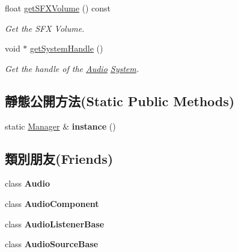\begin{DoxyCompactItemize}
float \hyperlink{class_magnum_1_1_audio_1_1_manager_a97df6d7c2738ba77d35581978a076379}{get\+S\+F\+X\+Volume} () const 
\begin{DoxyCompactList}\small\item\em Get the S\+FX Volume. \end{DoxyCompactList}\item 
void $\ast$ \hyperlink{class_magnum_1_1_audio_1_1_manager_a666d38790d8532041580f8908be4c3ed}{get\+System\+Handle} ()
\begin{DoxyCompactList}\small\item\em Get the handle of the \hyperlink{class_magnum_1_1_audio}{Audio} \hyperlink{class_magnum_1_1_system}{System}. \end{DoxyCompactList}\end{DoxyCompactItemize}
\subsection*{靜態公開方法(Static Public Methods)}
\begin{DoxyCompactItemize}
\item 
static \hyperlink{class_magnum_1_1_audio_1_1_manager}{Manager} \& {\bfseries instance} ()\hypertarget{class_magnum_1_1_audio_1_1_manager_a9f266534db2ea5671e2a008b228bf3c3}{}\label{class_magnum_1_1_audio_1_1_manager_a9f266534db2ea5671e2a008b228bf3c3}

\end{DoxyCompactItemize}
\subsection*{類別朋友(Friends)}
\begin{DoxyCompactItemize}
\item 
class {\bfseries Audio}\hypertarget{class_magnum_1_1_audio_1_1_manager_a211f008bd6a46efe478fe81d31e28933}{}\label{class_magnum_1_1_audio_1_1_manager_a211f008bd6a46efe478fe81d31e28933}

\item 
class {\bfseries Audio\+Component}\hypertarget{class_magnum_1_1_audio_1_1_manager_af76924648e1e664d148d0e3951b5a9ce}{}\label{class_magnum_1_1_audio_1_1_manager_af76924648e1e664d148d0e3951b5a9ce}

\item 
class {\bfseries Audio\+Listener\+Base}\hypertarget{class_magnum_1_1_audio_1_1_manager_a76a29692301e521e926995991a14b87d}{}\label{class_magnum_1_1_audio_1_1_manager_a76a29692301e521e926995991a14b87d}

\item 
class {\bfseries Audio\+Source\+Base}\hypertarget{class_magnum_1_1_audio_1_1_manager_a93f447a7ad19640b0dd05bafe9ba5552}{}\label{class_magnum_1_1_audio_1_1_manager_a93f447a7ad19640b0dd05bafe9ba5552}

\end{DoxyCompactItemize}


